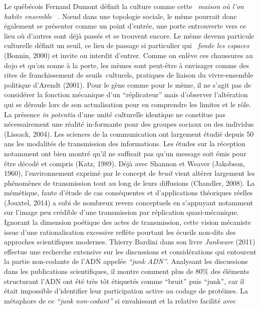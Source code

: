 Le qu\'eb\'ecois Fernand Dumont d\'efinit la culture comme cette \textit{{\guillemotleft}~maison o\`u l{\textquoteright}on habite ensemble~{\guillemotright} }\cite{Dumont1993}. N{\oe}ud dans une topologie sociale, le m\`eme pourrait donc \'egalement se pr\'esenter comme un point d{\textquoteright}entr\'ee, une porte entrouverte vers ce lieu o\`u d{\textquoteright}autres sont d\'ej\`a pass\'es et se trouvent encore. Le m\`eme devenu particule culturelle d\'efinit un seuil, ce lieu de passage si particulier qui \textit{{\guillemotleft}~fonde les espaces~{\guillemotright}} (Bonnin, 2000) et invite ou interdit d{\textquoteright}entrer. Comme on enl\`eve ces chaussures au dojo et qu{\textquoteright}on sonne \`a la porte, les m\`emes sont peut-\^etre \`a envisager comme des rites de franchissement de seuils~culturels, pratiques de liaison du vivre-ensemble politique d{\textquoteright}Arendt (2001). Pour le g\`ene comme pour le m\`eme, il ne s{\textquoteright}agit pas de consid\'erer la fonction m\'ecanique d{\textquoteright}un {\textquotedblleft}r\'eplicateur{\textquotedblright} mais d{\textquoteright}observer l{\textquoteright}alt\'eration qui se d\'eroule lors de son actualisation pour en comprendre les limites et le r\^ole. La pr\'esence \textit{in potentia }d{\textquoteright}une unit\'e culturelle identique ne constitue pas n\'ecessairement une r\'ealit\'e in-formante pour des groupes sociaux ou des individus (Lissack, 2004). Les sciences de la communication ont largement \'etudi\'e depuis 50 ans les modalit\'es de transmission des informations. Les \'etudes sur la r\'eception notamment ont bien montr\'e qu{\textquoteright}il ne suffisait pas qu{\textquoteright}un message soit \'emis pour \^etre d\'ecod\'e et compris (Katz, 1989). D\'ej\`a avec Shannon et Weaver (Jakobson, 1960), l{\textquoteright}environnement exprim\'e par le concept de\textit{ bruit }vient alt\'erer largement les ph\'enom\`enes de transmission tout au long de leurs diffusions (Chandler, 2008). La m\'em\'etique, faute d{\textquoteright}\'etude de cas cons\'equentes et d{\textquoteright}applications th\'eoriques r\'eelles (Jouxtel, 2014) a subi de nombreux revers conceptuels en s{\textquoteright}appuyant notamment sur l{\textquoteright}image peu cr\'edible d{\textquoteright}une transmission par r\'eplication quasi-m\'ecanique. Ignorant la dimension po\'etique des actes de transmission, cette vision m\'ecaniste issue d{\textquoteright}une rationalisation excessive refl\`ete pourtant les \'ecueils non-dits des approches scientifiques modernes. Thierry Bardini dans son livre \textit{Junkware }(2011) effectue une recherche extensive sur les discussions et consid\'erations qui entourent la partie non-codante de l{\textquoteright}ADN appel\'ee \textit{{\textquotedblleft}junk ADN{\textquotedblright}}. Analysant les discussions dans les publications scientifiques, il montre comment plus de 80\% des \'el\'ements structurant l{\textquoteright}ADN ont \'et\'e tr\`es t\^ot \'etiquet\'es comme {\textquotedblleft}bruit{\textquotedblright} puis {\textquotedblleft}junk{\textquotedblright}, car il \'etait impossible d{\textquoteright}identifier leur participation active au codage de prot\'eines. La m\'etaphore de ce \textit{{\textquotedblleft}junk non-codant{\textquotedblright} }si envahissant et la relative facilit\'e avec 
